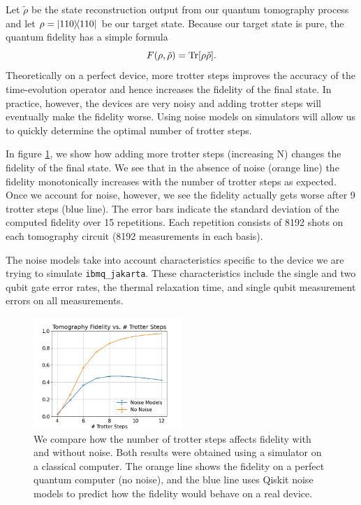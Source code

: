 \documentclass[aps,prl, reprint]{revtex4-2}
\begin{document}
Let $\tilde{\rho}$ be the state reconstruction output from our quantum tomography process and let $\rho = \dyad{110}$ be our target state. Because our target state is pure, the quantum fidelity has a simple formula
\begin{equation}
F(\rho, \tilde{\rho}) = \Tr[\rho\tilde{\rho}].
\end{equation}
Theoretically on a perfect device, more trotter steps improves the accuracy of the time-evolution operator and hence increases the fidelity of the final state. In practice, however, the devices are very noisy and adding trotter steps will eventually make the fidelity worse. Using noise models on simulators will allow us to quickly determine the optimal number of trotter steps. 

In figure \ref{fig:SimFids}, we show how adding more trotter steps (increasing N) changes the fidelity of the final state. We see that in the absence of noise (orange line) the fidelity monotonically increases with the number of trotter steps as expected. Once we account for noise, however, we see the fidelity actually gets worse after 9 trotter steps (blue line). The error bars indicate the standard deviation of the computed fidelity over 15 repetitions. Each repetition consists of 8192 shots on each tomography circuit (8192 measurements in each basis).

The noise models take into account characteristics specific to the device we are trying to simulate \texttt{ibmq\_jakarta}. These characteristics include the single and two qubit gate error rates, the thermal relaxation time, and single qubit measurement errors on all measurements. 

\begin{figure}
\includegraphics[width=0.5\textwidth]{../TomographyFidelities.png}
\caption{We compare how the number of trotter steps affects fidelity with and without noise. Both results were obtained using a simulator on a classical computer. The orange line shows the fidelity on a perfect quantum computer (no noise), and the blue line uses Qiskit noise models to predict how the fidelity would behave on a real device.}
\label{fig:SimFids}
\end{figure}
\end{document}
